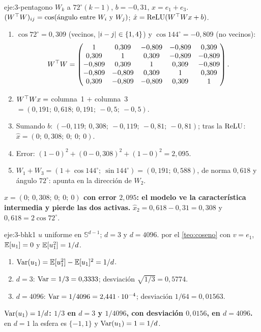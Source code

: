 \begin{solucion}{eje:3-pentagono}
\datos $W_k$ a $72^\circ(k-1)$, $b=-0{,}31$, $x=e_1+e_3$.
\planteamiento $(W^{\top} W)_{ij}=\cos(\text{ángulo entre }W_i\text{ y }W_j)$; $\hat x=\operatorname{ReLU}(W^{\top} Wx+b)$.
\pasos
\begin{enumerate}[label=\arabic*.]
  \item $\cos 72^\circ=0{,}309$ (vecinos, $\lvert i-j\rvert\in\{1,4\}$) y $\cos 144^\circ=-0{,}809$ (no vecinos):
  \[
  W^{\top} W=\begin{pmatrix}1&0{,}309&-0{,}809&-0{,}809&0{,}309\\0{,}309&1&0{,}309&-0{,}809&-0{,}809\\-0{,}809&0{,}309&1&0{,}309&-0{,}809\\-0{,}809&-0{,}809&0{,}309&1&0{,}309\\0{,}309&-0{,}809&-0{,}809&0{,}309&1\end{pmatrix}.
  \]
  \item $W^{\top} Wx=$ columna~1 $+$ columna~3 $=(0{,}191;\allowbreak\ 0{,}618;\allowbreak\ 0{,}191;\allowbreak\ -0{,}5;\allowbreak\ -0{,}5)$.
  \item Sumando $b$: $(-0{,}119;\allowbreak\ 0{,}308;\allowbreak\ -0{,}119;\allowbreak\ -0{,}81;\allowbreak\ -0{,}81)$; tras la $\operatorname{ReLU}$: $\hat x=(0;\allowbreak\ 0{,}308;\allowbreak\ 0;\allowbreak\ 0;\allowbreak\ 0)$.
  \item Error: $(1-0)^{2}+(0-0{,}308)^{2}+(1-0)^{2}=2{,}095$.
  \item $W_1+W_3=(1+\cos 144^\circ;\allowbreak\ \sin 144^\circ)=(0{,}191;\allowbreak\ 0{,}588)$, de norma $0{,}618$ y ángulo $72^\circ$: apunta en la dirección de $W_2$.
\end{enumerate}
\resultado \textbf{$\hat x=(0;\allowbreak\ 0{,}308;\allowbreak\ 0;\allowbreak\ 0;\allowbreak\ 0)$ con error $2{,}095$: el modelo ve la característica intermedia y pierde las dos activas.}
\comprobacion $\hat x_2=0{,}618-0{,}31=0{,}308$ y $0{,}618=2\cos 72^\circ$.
\end{solucion}

\begin{solucion}{eje:3-bhk1}
\datos $u$ uniforme en $\mathbb{S}^{d-1}$; $d=3$ y $d=4096$.
\planteamiento por el \cref{teo:coseno} con $v=e_1$, $\mathbb{E}[u_1]=0$ y $\mathbb{E}[u_1^{2}]=1/d$.
\pasos
\begin{enumerate}[label=\arabic*.]
  \item $\operatorname{Var}(u_1)=\mathbb{E}[u_1^{2}]-\mathbb{E}[u_1]^{2}=1/d$.
  \item $d=3$: $\operatorname{Var}=1/3=0{,}3333$; desviación $\sqrt{1/3}=0{,}5774$.
  \item $d=4096$: $\operatorname{Var}=1/4096=2{,}441\cdot 10^{-4}$; desviación $1/64=0{,}01563$.
\end{enumerate}
\resultado \textbf{$\operatorname{Var}(u_1)=1/d$: $1/3$ en $d=3$ y $1/4096$, con desviación $0{,}0156$, en $d=4096$.}
\comprobacion en $d=1$ la esfera es $\{-1,1\}$ y $\operatorname{Var}(u_1)=1=1/d$.
\end{solucion}

